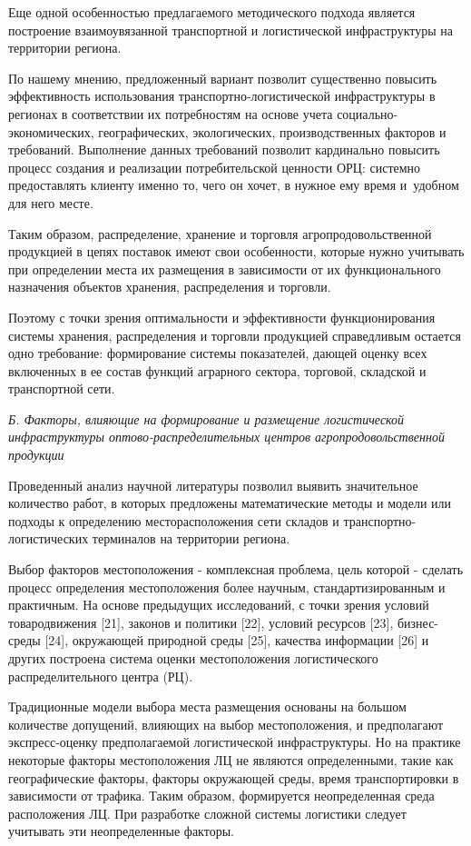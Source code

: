 \begin{multicols}{2}
Еще одной особенностью предлагаемого методического подхода является
построение взаимоувязанной транспортной и логистической инфраструктуры
на территории региона.

По нашему мнению, предложенный вариант позволит существенно повысить
эффективность использования транспортно-логистической инфраструктуры в
регионах в соответствии их потребностям на основе учета
социально-экономических, географических, экологических, производственных
факторов и требований. Выполнение данных требований позволит кардинально
повысить процесс создания и реализации потребительской ценности ОРЦ:
системно предоставлять клиенту именно то, чего он хочет, в нужное ему
время и~удобном для него месте.

Таким образом, распределение, хранение и торговля агропродовольственной
продукцией в цепях поставок имеют свои особенности, которые нужно
учитывать при определении места их размещения в зависимости от их
функционального назначения объектов хранения, распределения и торговли.

Поэтому с точки зрения оптимальности и эффективности функционирования
системы хранения, распределения и торговли продукцией справедливым
остается одно требование: формирование системы показателей, дающей
оценку всех включенных в ее состав функций аграрного сектора, торговой,
складской и транспортной сети.

\emph{Б. Факторы, влияющие на формирование и размещение логистической
инфраструктуры оптово-распределительных центров агропродовольственной
продукции}

Проведенный анализ научной литературы позволил выявить значительное
количество работ, в которых предложены математические методы и модели
или подходы к определению месторасположения сети складов и
транспортно-логистических терминалов на территории региона.

Выбор факторов местоположения - комплексная проблема, цель которой -
сделать процесс определения местоположения более научным,
стандартизированным и практичным. На основе предыдущих исследований, с
точки зрения условий товародвижения {[}21{]}, законов и политики
{[}22{]}, условий ресурсов {[}23{]}, бизнес-среды {[}24{]}, окружающей
природной среды {[}25{]}, качества информации {[}26{]} и других
построена система оценки местоположения логистического
распределительного центра (РЦ).

Традиционные модели выбора места размещения основаны на большом
количестве допущений, влияющих на выбор местоположения, и предполагают
экспресс-оценку предполагаемой логистической инфраструктуры. Но на
практике некоторые факторы местоположения ЛЦ не являются определенными,
такие как географические факторы, факторы окружающей среды, время
транспортировки в зависимости от трафика. Таким образом, формируется
неопределенная среда расположения ЛЦ. При разработке сложной системы
логистики следует учитывать эти неопределенные факторы.


\end{multicols}
